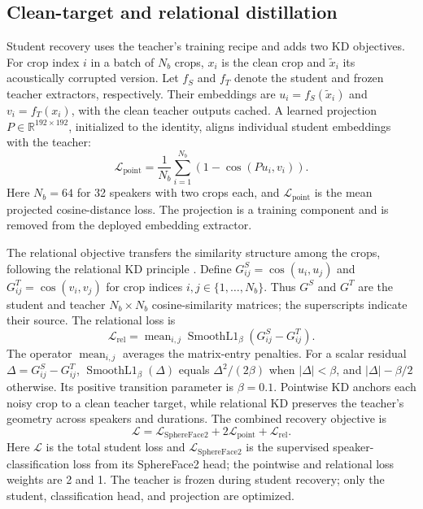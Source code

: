 \documentclass[11pt]{article}
\begin{document}
\subsection{Clean-target and relational distillation}
Student recovery uses the teacher's training recipe and adds two KD objectives. For crop index $i$ in a batch of $N_b$ crops, $x_i$ is the clean crop and $\tilde x_i$ its acoustically corrupted version. Let $f_S$ and $f_T$ denote the student and frozen teacher extractors, respectively. Their embeddings are $u_i=f_S(\tilde x_i)$ and $v_i=f_T(x_i)$, with the clean teacher outputs cached. A learned projection $P\in\mathbb R^{192\times192}$, initialized to the identity, aligns individual student embeddings with the teacher:
\begin{equation}
 \mathcal L_{\mathrm{point}}=\frac{1}{N_b}\sum_{i=1}^{N_b}
 \left(1-\cos(Pu_i,v_i)\right).
\end{equation}
Here $N_b=64$ for 32 speakers with two crops each, and $\mathcal L_{\mathrm{point}}$ is the mean projected cosine-distance loss. The projection is a training component and is removed from the deployed embedding extractor.

The relational objective transfers the similarity structure among the crops, following the relational KD principle \citep{park2019rkd}. Define $G^S_{ij}=\cos(u_i,u_j)$ and $G^T_{ij}=\cos(v_i,v_j)$ for crop indices $i,j\in\{1,\ldots,N_b\}$. Thus $G^S$ and $G^T$ are the student and teacher $N_b\times N_b$ cosine-similarity matrices; the superscripts indicate their source. The relational loss is
\begin{equation}
 \mathcal L_{\mathrm{rel}}=\operatorname{mean}_{i,j}
 \operatorname{SmoothL1}_{\beta}(G^S_{ij}-G^T_{ij}).
\end{equation}
The operator $\operatorname{mean}_{i,j}$ averages the matrix-entry penalties. For a scalar residual $\Delta=G^S_{ij}-G^T_{ij}$, $\operatorname{SmoothL1}_{\beta}(\Delta)$ equals $\Delta^2/(2\beta)$ when $|\Delta|<\beta$, and $|\Delta|-\beta/2$ otherwise. Its positive transition parameter is $\beta=0.1$. Pointwise KD anchors each noisy crop to a clean teacher target, while relational KD preserves the teacher's geometry across speakers and durations. The combined recovery objective is
\begin{equation}
 \mathcal L=\mathcal L_{\mathrm{SphereFace2}}
       +2\mathcal L_{\mathrm{point}}+\mathcal L_{\mathrm{rel}}.
\end{equation}
Here $\mathcal L$ is the total student loss and $\mathcal L_{\mathrm{SphereFace2}}$ is the supervised speaker-classification loss from its SphereFace2 head; the pointwise and relational loss weights are 2 and 1. The teacher is frozen during student recovery; only the student, classification head, and projection are optimized.
\end{document}
